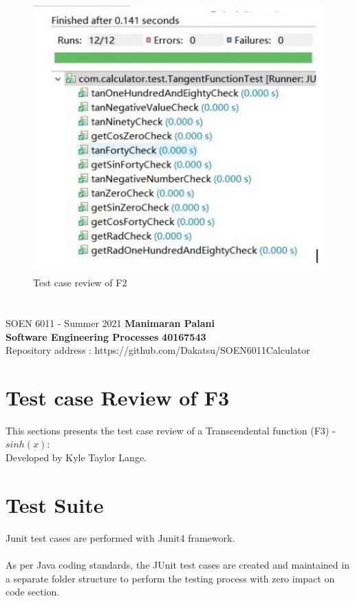 \documentclass[letterpaper, 11pt]{report}
\begin{document}
\begin{figure}[htp]
    \centering
    \includegraphics[width=16cm]{SOEN_6011-Problem-7/F5P7.jpg}
    \caption{Test case review of F2}
    \label{fig:galaxy}
\end{figure}
 \begin{center} 
\end{center}

\pagebreak

\section*{}
\normalsize {SOEN 6011 - Summer 2021} \hfill \textbf{Manimaran Palani} \\
\textbf{ Software Engineering Processes}  \hfill \textbf{40167543} \\
\hfill Repository address : https://github.com/Dakatsu/SOEN6011Calculator
\\
\section*{Test case Review of F3}
This sections presents the test case review of a  Transcendental function (F3) - $sinh(x)$: \\Developed by Kyle Taylor Lange.
\section*{Test Suite}
Junit test cases\cite{vogella} are performed with Junit4 framework.
\\\\
As per Java coding standards, the JUnit test cases are created and maintained in a separate folder structure to perform the testing process with zero impact on code section.
\end{document}
